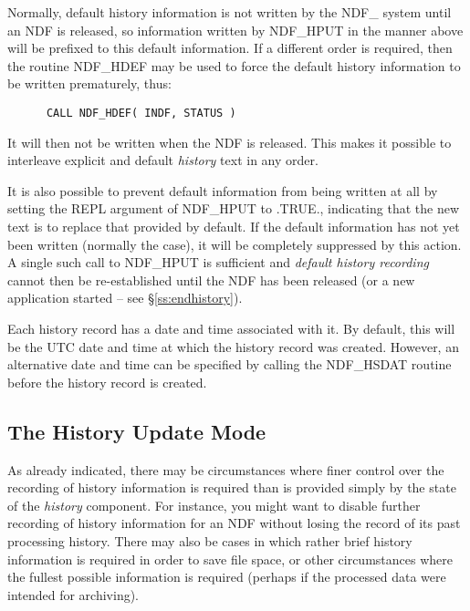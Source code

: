 \documentclass[twoside,11pt]{article}
\newcommand{\htmlref}[2]{#1}
\newcommand{\xlabel}[1]{}
\newcommand{\st}[1]{{\em{#1}}}
\begin{document}
Normally, default history information is not written by the NDF\_
system until an NDF is released, so information written by NDF\_HPUT
in the manner above will be prefixed to this default information. If a
different order is required, then the routine \htmlref{NDF\_HDEF}{NDF_HDEF} may be used to
force the default history information to be written prematurely, thus:

\small
\begin{verbatim}
      CALL NDF_HDEF( INDF, STATUS )
\end{verbatim}
\normalsize

It will then not be written when the NDF is released. This makes it
possible to interleave explicit and default \st{history\/} text in any order.

It is also possible to prevent default information from being written
at all by setting the REPL argument of NDF\_HPUT to .TRUE., indicating
that the new text is to replace that provided by default. If the
default information has not yet been written (normally the case), it
will be completely suppressed by this action. A single such call to
NDF\_HPUT is sufficient and \st{default history recording\/} cannot then be
re-established until the NDF has been released (or a new application
started -- see \S\ref{ss:endhistory}).

Each history record has a date and time associated with it. By default,
this will be the UTC date and time at which the history record was
created. However, an alternative date and time can be specified by
calling the \htmlref{NDF\_HSDAT}{NDF_HSDAT} routine before the history
record is created.

\subsection{\xlabel{the_history_update_mode}\label{ss:historyupdatemode}The History Update Mode}

As already indicated, there may be circumstances where finer control
over the recording of history information is required than is provided
simply by the state of the \st{history\/} component. For instance, you
might want to disable further recording of history information for an
NDF without losing the record of its past processing history. There
may also be cases in which rather brief history information is
required in order to save file space, or other circumstances where the
fullest possible information is required (perhaps if the processed
data were intended for archiving).
\end{document}
